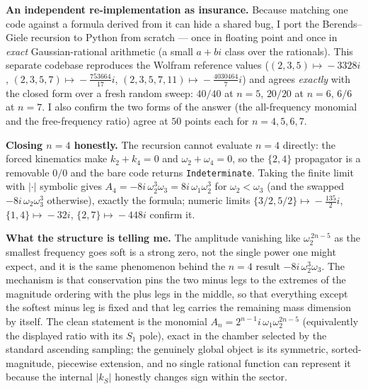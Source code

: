 \documentclass[11pt]{article}
\begin{document}
\medskip
\noindent\textbf{An independent re-implementation as insurance.}
Because matching one code against a formula derived from it can hide a shared bug, I port the
Berends--Giele recursion to Python from scratch --- once in floating point and once in
\emph{exact} Gaussian-rational arithmetic (a small $a+bi$ class over the rationals). This
separate codebase reproduces the Wolfram reference values
($(2,3,5)\!\mapsto\!-3328i$, $(2,3,5,7)\!\mapsto\!-\tfrac{753664}{17}i$,
$(2,3,5,7,11)\!\mapsto\!-\tfrac{4030464}{7}i$) and agrees \emph{exactly} with the closed
form over a fresh random sweep: $40/40$ at $n=5$, $20/20$ at $n=6$, $6/6$ at $n=7$. I also
confirm the two forms of the answer (the all-frequency monomial and the free-frequency ratio)
agree at $50$ points each for $n=4,5,6,7$.

\medskip
\noindent\textbf{Closing $n=4$ honestly.}
The recursion cannot evaluate $n=4$ directly: the forced kinematics make $k_2+k_4=0$ and
$\omega_2+\omega_4=0$, so the $\{2,4\}$ propagator is a removable $0/0$ and the bare code
returns \texttt{Indeterminate}. Taking the finite limit with $|\cdot|$ symbolic gives
$A_4=-8i\,\omega_2^3\omega_3=8i\,\omega_1\omega_2^3$ for $\omega_2<\omega_3$ (and the swapped
$-8i\,\omega_2\omega_3^3$ otherwise), exactly the formula; numeric limits
$\{3/2,5/2\}\!\mapsto\!-\tfrac{135}{2}i$, $\{1,4\}\!\mapsto\!-32i$,
$\{2,7\}\!\mapsto\!-448i$ confirm it.

\medskip
\noindent\textbf{What the structure is telling me.}
The amplitude vanishing like $\omega_2^{\,2n-5}$ as the smallest frequency goes soft is a
strong zero, not the single power one might expect, and it is the same phenomenon behind the
$n=4$ result $-8i\,\omega_2^3\omega_3$. The mechanism is that conservation pins the two minus
legs to the extremes of the magnitude ordering with the plus legs in the middle, so that
everything except the softest minus leg is fixed and that leg carries the remaining mass
dimension by itself. The clean statement is the monomial $A_n=2^{n-1}i\,\omega_1\omega_2^{2n-5}$
(equivalently the displayed ratio with its $S_1$ pole), exact in the chamber selected by the
standard ascending sampling; the genuinely global object is its symmetric, sorted-magnitude,
piecewise extension, and no single rational function can represent it because the internal
$|k_S|$ honestly changes sign within the sector.
\end{document}
